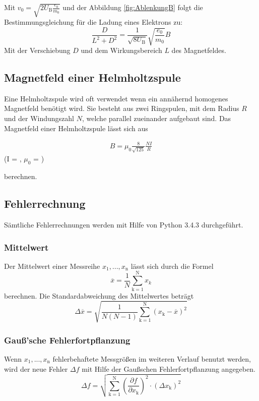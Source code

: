 Mit $v_0 = \sqrt{2 U_\text{B} \frac{e_0}{m_0}}$ und der Abbildung \eqref{fig:AblenkungB} folgt die Bestimmungsgleichung für die Ladung eines Elektrons zu:
\begin{equation}
	\frac{D}{L^2 + D^2} = \frac{1}{\sqrt{8 U_\text{B}}} \sqrt{\frac{e_0}{m_0}} B
	\label{eqn:e0m}
\end{equation}
Mit der Verschiebung $D$ und dem Wirkungsbereich $L$ des Magnetfeldes.

\subsection{Magnetfeld einer Helmholtzspule}
Eine Helmholtzspule wird oft verwendet wenn ein annähernd homogenes Magnetfeld benötigt wird. Sie besteht aus zwei Ringspulen, mit dem Radius $R$ und der Windungszahl $N$, welche parallel zueinander aufgebaut sind. Das Magnetfeld einer Helmholtzspule lässt sich aus
\begin{center}
	\begin{align}
		B = \mu_0 \frac{8}{\sqrt{125}} \frac{N I}{R}
		\label{eqn:BH}
	\end{align}
	\small{(I = , $\mu_0$ = )}
\end{center}
berechnen.

\subsection{Fehlerrechnung}
Sämtliche Fehlerrechnungen werden mit Hilfe von Python 3.4.3 durchgeführt.
\subsubsection{Mittelwert}
Der Mittelwert einer Messreihe $x_\text{1}, ... ,x_\text{n}$ lässt sich durch die Formel
\begin{equation}
	\overline{x} = \frac{1}{N} \sum_{\text{k}=1}^\text{N} x_k
	\label{eqn:ave}
\end{equation}
berechnen. Die Standardabweichung des Mittelwertes beträgt
\begin{equation}
	\Delta \overline{x} = \sqrt{ \frac{1}{N(N-1)} \sum_{\text{k}=1}^\text{N} (x_\text{k} - \overline{x})^2}
	\label{eqn:std}
\end{equation}

\subsubsection{Gauß'sche Fehlerfortpflanzung}
Wenn $x_\text{1}, ..., x_\text{n}$ fehlerbehaftete Messgrößen im weiteren Verlauf benutzt werden, wird der neue Fehler $\Delta f$ mit Hilfe der Gaußschen Fehlerfortpflanzung angegeben.
\begin{equation}
	\Delta f = \sqrt{\sum_{\text{k}=1}^\text{N} \left( \frac{ \partial f}{\partial x_\text{k}} \right) ^2 \cdot (\Delta x_\text{k})^2}
	\label{eqn:var}
\end{equation}

